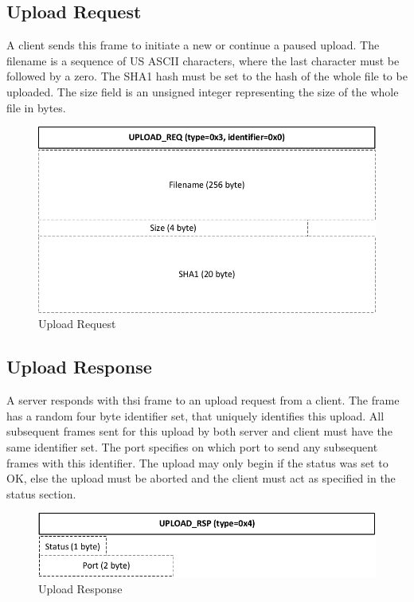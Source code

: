 \documentclass[]{article}
\begin{document}
\subsection{Upload Request}
A client sends this frame to initiate a new or continue a paused upload.
The filename is a sequence of US ASCII characters, where the last character must be followed
by a zero. The SHA1 hash must be set to the hash of the whole file to be uploaded.
The size field is an unsigned integer representing the size of the whole file in bytes.

\begin{figure}[H]
\centering
\includegraphics[width=\textwidth]{frames/upload-req.pdf}
\caption{Upload Request}
\label{UPLOAD-REQ}
\end{figure}

\subsection{Upload Response}

A server responds with thsi frame to an upload request from a client. The frame has a 
random four byte identifier set, that uniquely identifies this upload. All subsequent
frames sent for this upload by both server and client must have the same identifier set.
The port specifies on which port to send any subsequent frames with this identifier.
The upload may only begin if the status was set to OK, else the upload must be aborted
and the client must act as specified in the status section.


\begin{figure}[H]
\centering
\includegraphics[width=\textwidth]{frames/upload-rsp.pdf}
\caption{Upload Response}
\label{UPLOAD-RSP}
\end{figure}
\end{document}
